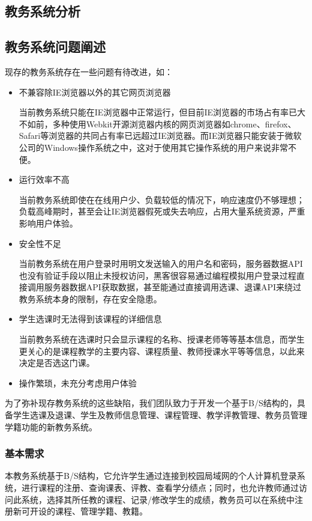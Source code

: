 \begin{center}
  \section{教务系统分析}
\end{center}


\subsection{教务系统问题阐述}
现存的教务系统存在一些问题有待改进，如：

\begin{itemize}
  \item 不兼容除IE浏览器以外的其它网页浏览器
  
  \CJKindent 当前教务系统只能在IE浏览器中正常运行，但目前IE浏览器的市场占有率已大不如前，多种使用Webkit开源浏览器内核的网页浏览器如chrome、firefox、Safari等浏览器的共同占有率已远超过IE浏览器。而IE浏览器只能安装于微软公司的Windows操作系统\texttrademark 之中，这对于使用其它操作系统的用户来说非常不便。
  
  \item 运行效率不高
  
  \CJKindent 当前教务系统即使在在线用户少、负载较低的情况下，响应速度仍不够理想；负载高峰期时，甚至会让IE浏览器假死或失去响应，占用大量系统资源，严重影响用户体验。
  
  \item 安全性不足
  
  \CJKindent 当前教务系统在用户登录时用明文发送输入的用户名和密码，服务器数据API也没有验证手段以阻止未授权访问，黑客很容易通过编程模拟用户登录过程直接调用服务器数据API获取数据，甚至能通过直接调用选课、退课API来绕过教务系统本身的限制，存在安全隐患。
  
  \item 学生选课时无法得到该课程的详细信息
  
  \CJKindent 当前教务系统在选课时只会显示课程的名称、授课老师等等基本信息，而学生更关心的是课程教学的主要内容、课程质量、教师授课水平等等信息，以此来决定是否选这门课。
  
  \item 操作繁琐，未充分考虑用户体验
\end{itemize}

为了弥补现存教务系统的这些缺陷，我们团队致力于开发一个基于B/S结构的，具备学生选课及退课、学生及教师信息管理、课程管理、教学评教管理、教务员管理学籍功能的新教务系统。

\subsubsection{基本需求}
本教务系统基于B/S结构，它允许学生通过连接到校园局域网的个人计算机登录系统，进行课程的注册、查询课表、评教、查看学分绩点；同时，也允许教师通过访问此系统，选择其所任教的课程、记录/修改学生的成绩，教务员可以在系统中注册新可开设的课程、管理学籍、教籍。

